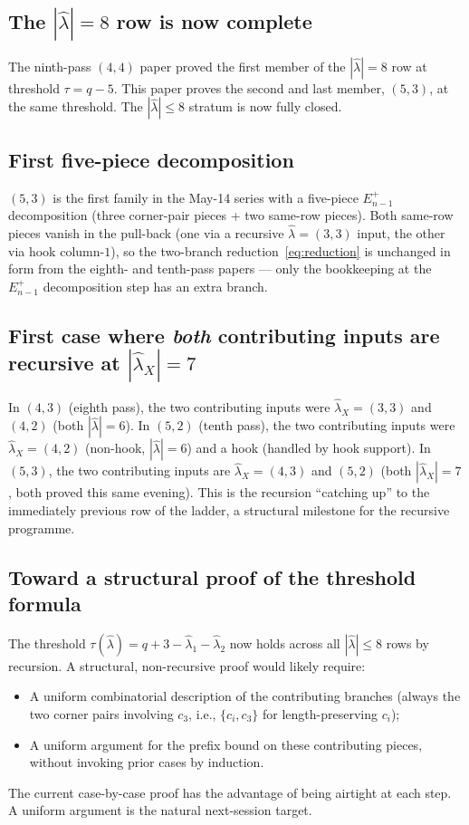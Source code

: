 \documentclass[11pt]{article}
\theoremstyle{definition}
\newcommand{\hatl}{\widehat\lambda}
\begin{document}
\subsection{The $|\hatl| = 8$ row is now complete}

The ninth-pass $(4, 4)$ paper proved the first member of the
$|\hatl| = 8$ row at threshold $\tau = q - 5$.  This paper proves the
second and last member, $(5, 3)$, at the same threshold.  The
$|\hatl| \le 8$ stratum is now fully closed.

\subsection{First five-piece decomposition}

$(5, 3)$ is the first family in the May-14 series with a five-piece
$E^+_{n-1}$ decomposition (three corner-pair pieces + two same-row
pieces).  Both same-row pieces vanish in the pull-back (one via a
recursive $\hatl{=}(3,3)$ input, the other via hook column-$1$), so
the two-branch reduction~\eqref{eq:reduction} is unchanged in form
from the eighth- and tenth-pass papers --- only the bookkeeping at the
$E^+_{n-1}$ decomposition step has an extra branch.

\subsection{First case where \emph{both} contributing inputs are
recursive at $|\hatl_X| = 7$}

In $(4, 3)$ (eighth pass), the two contributing inputs were
$\hatl_X = (3, 3)$ and $(4, 2)$ (both $|\hatl| = 6$).  In $(5, 2)$
(tenth pass), the two contributing inputs were $\hatl_X = (4, 2)$
(non-hook, $|\hatl| = 6$) and a hook (handled by hook support).  In
$(5, 3)$, the two contributing inputs are $\hatl_X = (4, 3)$ and
$(5, 2)$ (both $|\hatl_X| = 7$, both proved this same evening).  This
is the recursion ``catching up'' to the immediately previous row of
the ladder, a structural milestone for the recursive programme.

\subsection{Toward a structural proof of the threshold formula}

The threshold $\tau(\hatl) = q + 3 - \hatl_1 - \hatl_2$ now holds
across all $|\hatl| \le 8$ rows by recursion.  A structural,
non-recursive proof would likely require:
\begin{itemize}[topsep=0.2em,itemsep=0.1em]
\item A uniform combinatorial description of the contributing branches
   (always the two corner pairs involving $c_3$, i.e., $\{c_i, c_3\}$
   for length-preserving $c_i$);
\item A uniform argument for the prefix bound on these contributing
   pieces, without invoking prior cases by induction.
\end{itemize}
The current case-by-case proof has the advantage of being airtight at
each step.  A uniform argument is the natural next-session target.
\end{document}

